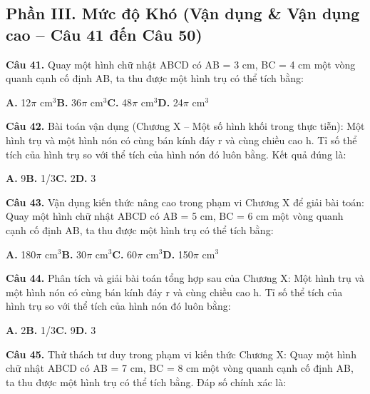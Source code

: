 \documentclass[11pt,a4paper]{article}
\begin{document}
\subsection*{\color{accent} Phần III. Mức độ Khó (Vận dụng \& Vận dụng cao -- Câu 41 đến Câu 50)}
\textbf{\color{primary} Câu 41.} Quay một hình chữ nhật ABCD có AB = 3 cm, BC = 4 cm một vòng quanh cạnh cố định AB, ta thu được một hình trụ có thể tích bằng:\par
\hspace*{1.5em}\textbf{A.} 12$\pi$ cm$^3$\quad\quad \textbf{B.} 36$\pi$ cm$^3$\quad\quad \textbf{C.} 48$\pi$ cm$^3$\quad\quad \textbf{D.} 24$\pi$ cm$^3$\par\vspace{2pt}
\textbf{\color{primary} Câu 42.} Bài toán vận dụng (Chương X – Một số hình khối trong thực tiễn): Một hình trụ và một hình nón có cùng bán kính đáy r và cùng chiều cao h. Tỉ số thể tích của hình trụ so với thể tích của hình nón đó luôn bằng. Kết quả đúng là:\par
\hspace*{1.5em}\textbf{A.} 9\quad\quad \textbf{B.} 1/3\quad\quad \textbf{C.} 2\quad\quad \textbf{D.} 3\par\vspace{2pt}
\textbf{\color{primary} Câu 43.} Vận dụng kiến thức nâng cao trong phạm vi Chương X để giải bài toán: Quay một hình chữ nhật ABCD có AB = 5 cm, BC = 6 cm một vòng quanh cạnh cố định AB, ta thu được một hình trụ có thể tích bằng:\par
\hspace*{1.5em}\textbf{A.} 180$\pi$ cm$^3$\quad\quad \textbf{B.} 30$\pi$ cm$^3$\quad\quad \textbf{C.} 60$\pi$ cm$^3$\quad\quad \textbf{D.} 150$\pi$ cm$^3$\par\vspace{2pt}
\textbf{\color{primary} Câu 44.} Phân tích và giải bài toán tổng hợp sau của Chương X: Một hình trụ và một hình nón có cùng bán kính đáy r và cùng chiều cao h. Tỉ số thể tích của hình trụ so với thể tích của hình nón đó luôn bằng:\par
\hspace*{1.5em}\textbf{A.} 2\quad\quad \textbf{B.} 1/3\quad\quad \textbf{C.} 9\quad\quad \textbf{D.} 3\par\vspace{2pt}
\textbf{\color{primary} Câu 45.} Thử thách tư duy trong phạm vi kiến thức Chương X: Quay một hình chữ nhật ABCD có AB = 7 cm, BC = 8 cm một vòng quanh cạnh cố định AB, ta thu được một hình trụ có thể tích bằng. Đáp số chính xác là:\par
\end{document}
